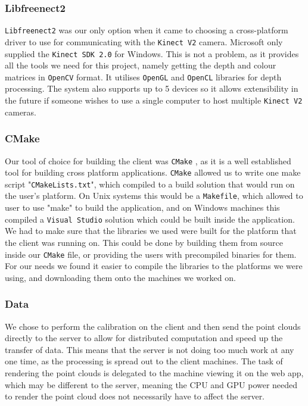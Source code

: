 \documentclass{article}
\begin{document}
\subsubsection{Libfreenect2}
\texttt{Libfreenect2} \cite{libfreenect} was our only option when it came to choosing a cross-platform driver to use for communicating with the \texttt{Kinect V2} camera. Microsoft only supplied the \texttt{Kinect SDK 2.0} \cite{kinect} for Windows. This is not a problem, as it provides all the tools we need for this project, namely getting the depth and colour matrices in \texttt{OpenCV} \cite{opencv} format. It utilises \texttt{OpenGL} \cite{opengl} and \texttt{OpenCL} \cite{opencl} libraries for depth processing. The system also supports up to 5 devices so it allows extensibility in the future if someone wishes to use a single computer to host multiple \texttt{Kinect V2} cameras.
\subsubsection{CMake}
Our tool of choice for building the client was \texttt{CMake} \cite{cmake}, as it is a well established tool for building cross platform applications. \texttt{CMake} \cite{cmake} allowed us to write one make script "\texttt{CMakeLists.txt}", which compiled to a build solution that would run on the user's platform. On Unix systems this would be a \texttt{Makefile}, which allowed to user to use "make" to build the application, and on Windows machines this compiled a \texttt{Visual Studio} \cite{vs} solution which could be built inside the application. We had to make sure that the libraries we used were built for the platform that the client was running on. This could be done by building them from source inside our \texttt{CMake} \cite{cmake} file, or providing the users with precompiled binaries for them. For our needs we found it easier to compile the libraries to the platforms we were using, and downloading them onto the machines we worked on. 
\subsubsection{Data}
We chose to perform the calibration on the client and then send the point clouds directly to the server to allow for distributed computation and speed up the transfer of data. This means that the server is not doing too much work at any one time, as the processing is spread out to the client machines. The task of rendering the point clouds is delegated to the machine viewing it on the web app, which may be different to the server, meaning the CPU and GPU power needed to render the point cloud does not necessarily have to affect the server. 
\end{document}
